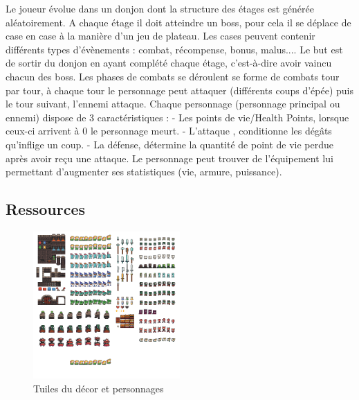 \documentclass[a4paper,12pt]{article}
\begin{document}
Le joueur évolue dans un donjon dont la structure des étages est générée aléatoirement. A chaque étage il doit atteindre un boss, pour cela il se déplace de case en case à la manière d’un jeu de plateau. Les cases peuvent contenir différents types d'évènements : combat, récompense, bonus, malus.... Le but est de sortir du donjon en ayant complété chaque étage, c'est-à-dire avoir vaincu chacun des boss. 
\bigbreak
Les phases de combats se déroulent se forme de combats tour par tour, à chaque tour le personnage peut attaquer (différents coups d'épée) puis le tour suivant, l'ennemi attaque. Chaque personnage (personnage principal ou ennemi) dispose de 3 caractéristiques :
- Les points de vie/Health Points, lorsque ceux-ci arrivent à 0 le personnage meurt. 
- L'attaque , conditionne les dégâts qu'inflige un coup.
- La défense, détermine la quantité de point de vie perdue après avoir reçu une attaque.
\bigbreak
 Le personnage peut trouver de l’équipement lui permettant d’augmenter ses statistiques (vie, armure, puissance).

\subsection{Ressources}

\begin{figure}[h]
\begin{center}
\includegraphics[width=0.5\textwidth]{dungeontiles.png}
\caption{\label{tiles}Tuiles du décor et personnages}
\end{center}
\end{figure}
\end{document}

